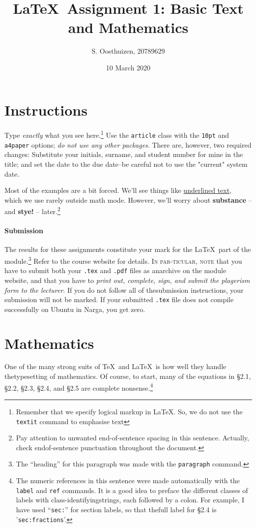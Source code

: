 \documentclass[10pt, a4paper]{article}
\title{\LaTeX\ Assignment 1: Basic Text and Mathematics}
\author{S. Oosthuizen, 20789629}
\date{10 March 2020}
\begin{document}
\maketitle
\section{Instructions}
Type \textit{exactly} what you see here.\footnote{Remember that we specify logical markup in \LaTeX. So, we do not use the \texttt{textit} com\-mand to emphasise text} Use the \texttt{article} class with the \texttt{10pt} and \texttt{a4paper} options; \textit{do not use any other packages}. There are, however, two re\-quired changes: Substitute your initials, surname, and student number for mine in the title; and set the date to the due date--be careful not to use the "current" system date.\par
Most of the examples are a bit forced. We'll see things like \underline{underlined text},\\
which we use rarely outside math mode. However, we'll worry about \textbf{substance}
-- and \textbf{stye!} -- later.\footnote{Pay attention to unwanted end-of-sentence spacing in this sentence. Actually, check end\-of-sentence punctuation throughout the document.}

\paragraph{Submission}The results for these assignments constitute your mark for the\linebreak
\LaTeX\ part of the module.\footnote{The “heading” for this paragraph was made with the \texttt{paragraph} command.} Refer to the course  website for details. \textsc{In par-}\linebreak \textsc{ticular, note} that you have to submit both your \texttt{.tex} and \texttt{.pdf} files  as an\linebreak archive on the module website, and that you have to \textit{print out, complete, sign, and submit the plagerism form to the lecturer}. If you do not follow all of the\linebreak submission instructions, your submission will not be marked. If your submitted \texttt{.tex} file does not compile successfully on Ubuntu in Narga, you get zero.

\section{Mathematics}
One of the many strong suits of \TeX\ and \LaTeX\ is how well they handle the\linebreak typesetting of mathematics. Of course, to start, many of the equations in \S2.1, \S2.2, \S2.3, \S2.4, and \S2.5 are complete nonsense.\footnote{The numeric references in this sentence were made automatically with the \texttt{label} and \texttt{ref} commands.  It is a good idea to preface the different classes of labels with class-identifying\linebreak strings, each followed by a colon.  For example, I have used “\texttt{sec:}”  for section labels, so that the\linebreak full label for \S2.4 is '\texttt{sec:fractions}'.}
\end{document}
